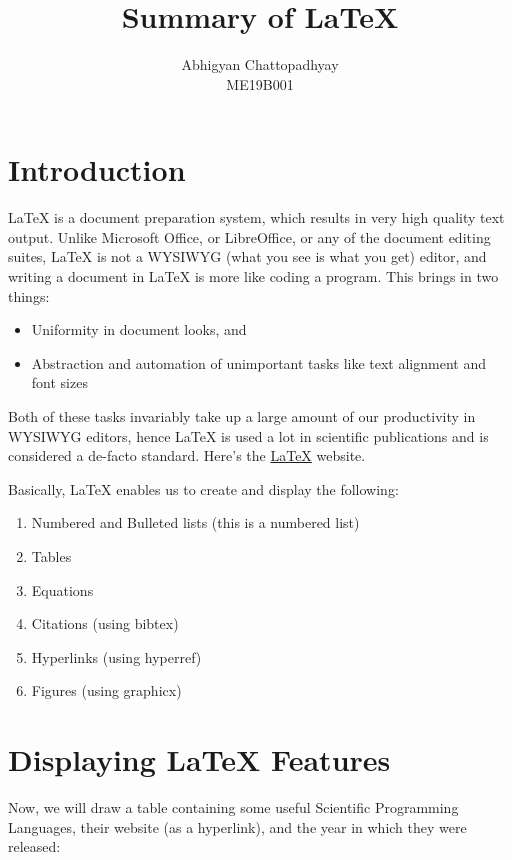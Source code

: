 \documentclass[12pt,a4paper]{article}
\title{Summary of \LaTeX{}}
\author{Abhigyan Chattopadhyay\\
ME19B001}
\begin{document}
\maketitle
\section{Introduction}
\LaTeX{} is a document preparation system, which results in very high quality text output. Unlike Microsoft Office, or LibreOffice, or any of the document editing suites, \LaTeX{} is not a WYSIWYG (what you see is what you get) editor, and writing a document in \LaTeX{} is more like coding a program. This brings in two things:

\begin{itemize}
\item Uniformity in document looks, and
\item Abstraction and automation of unimportant tasks like text alignment and font sizes
\end{itemize}	

Both of these tasks invariably take up a large amount of our productivity in WYSIWYG editors, hence \LaTeX{} is used a lot in scientific publications and is considered a de-facto standard. Here's the \href{https://www.latex-project.org/}{\LaTeX{}} website.

Basically, \LaTeX{} enables us to create and display the following:

\begin{enumerate}
\item Numbered and Bulleted lists (this is a numbered list)
\item Tables
\item Equations
\item Citations (using bibtex)
\item Hyperlinks (using hyperref)
\item Figures (using graphicx)
\end{enumerate}

\section{Displaying \LaTeX{} Features}

Now, we will draw a table containing some useful Scientific Programming Languages, their website (as a hyperlink), and the year in which they were released:
\end{document}
